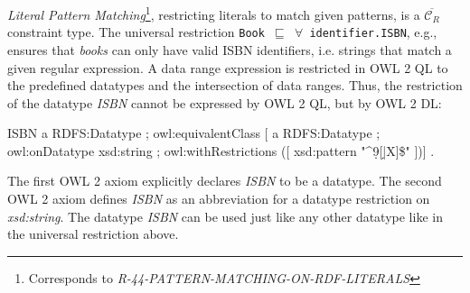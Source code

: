 \documentclass{llncs}
\newcommand{\ms}[1]{\texttt{#1}}
\newcommand{\tb}[1]{\todo[size=\small, color=green!40]{\textbf{Thomas:} #1}}
\newcommand{\er}[1]{\todo[size=\small, color=red!40]{\textbf{Erman:} #1}}
\begin{document}
{\em Literal Pattern Matching}\footnote{Corresponds to {\em R-44-PATTERN-MATCHING-ON-RDF-LITERALS}}, restricting literals to match given patterns,
is a $\overline{\mathcal{C}_R}$ constraint type.
The universal restriction \ms{Book $\sqsubseteq$ $\forall$ identifier.ISBN}, e.g., ensures that \emph{books} can only have valid ISBN identifiers, 
i.e. strings that match a given regular expression. 
A data range expression is restricted in OWL 2 QL to the predefined datatypes and the intersection of data ranges. 
Thus, the restriction of the datatype {\em ISBN} cannot be expressed by OWL 2 QL, but by OWL 2 DL: %

\begin{ex}
ISBN a RDFS:Datatype ; owl:equivalentClass [ a RDFS:Datatype ;
    owl:onDatatype xsd:string ; owl:withRestrictions ([ xsd:pattern "^\d{9}[\d|X]\$" ])] .
\end{ex}

The first OWL 2 axiom explicitly declares {\em ISBN} to be a datatype. %
The second OWL 2 axiom defines {\em ISBN} as an abbreviation for a datatype restriction on {\em xsd:string}. 
The datatype {\em ISBN} can be used just like any other datatype like in the universal restriction above.
\end{document}
